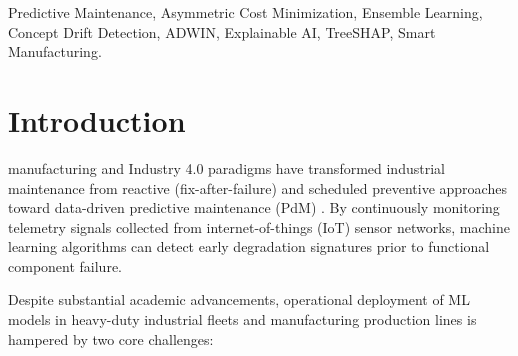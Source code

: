 \documentclass[conference]{IEEEtran}
\begin{document}
\begin{IEEEkeywords}
Predictive Maintenance, Asymmetric Cost Minimization, Ensemble Learning, Concept Drift Detection, ADWIN, Explainable AI, TreeSHAP, Smart Manufacturing.
\end{IEEEkeywords}

\section{Introduction}
 manufacturing and Industry 4.0 paradigms have transformed industrial maintenance from reactive (fix-after-failure) and scheduled preventive approaches toward data-driven predictive maintenance (PdM) \cite{roslan2024}. By continuously monitoring telemetry signals collected from internet-of-things (IoT) sensor networks, machine learning algorithms can detect early degradation signatures prior to functional component failure.

Despite substantial academic advancements, operational deployment of ML models in heavy-duty industrial fleets and manufacturing production lines is hampered by two core challenges:
\end{document}
